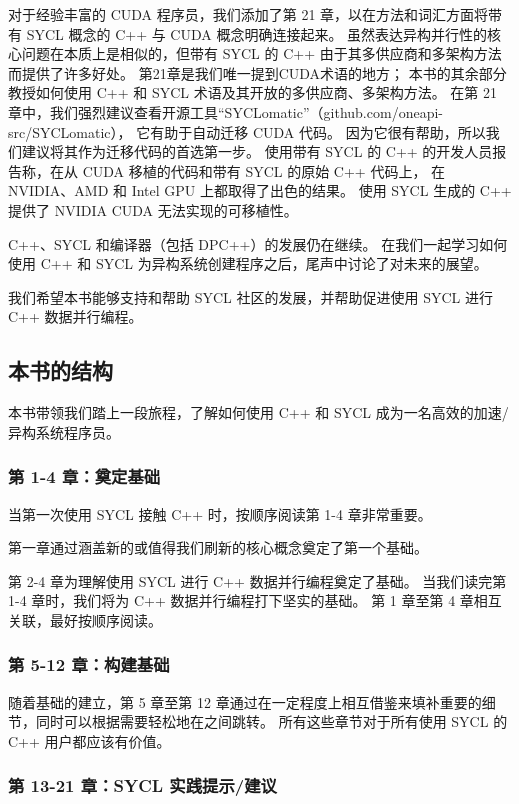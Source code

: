 对于经验丰富的 CUDA 程序员，我们添加了第 21 章，以在方法和词汇方面将带有 SYCL 概念的 C++ 与 CUDA 概念明确连接起来。 
虽然表达异构并行性的核心问题在本质上是相似的，但带有 SYCL 的 C++ 由于其多供应商和多架构方法而提供了许多好处。 
第21章是我们唯一提到CUDA术语的地方； 本书的其余部分教授如何使用 C++ 和 SYCL 术语及其开放的多供应商、多架构方法。 
在第 21 章中，我们强烈建议查看开源工具“SYCLomatic”（github.com/oneapi-src/SYCLomatic），
它有助于自动迁移 CUDA 代码。 因为它很有帮助，所以我们建议将其作为迁移代码的首选第一步。 
使用带有 SYCL 的 C++ 的开发人员报告称，在从 CUDA 移植的代码和带有 SYCL 的原始 C++ 代码上，
在 NVIDIA、AMD 和 Intel GPU 上都取得了出色的结果。 
使用 SYCL 生成的 C++ 提供了 NVIDIA CUDA 无法实现的可移植性。

C++、SYCL 和编译器（包括 DPC++）的发展仍在继续。 
在我们一起学习如何使用 C++ 和 SYCL 为异构系统创建程序之后，尾声中讨论了对未来的展望。

我们希望本书能够支持和帮助 SYCL 社区的发展，并帮助促进使用 SYCL 进行 C++ 数据并行编程。

\subsection{本书的结构}
本书带领我们踏上一段旅程，了解如何使用 C++ 和 SYCL 成为一名高效的加速/异构系统程序员。

\subsubsection{第 1-4 章：奠定基础}
当第一次使用 SYCL 接触 C++ 时，按顺序阅读第 1-4 章非常重要。

第一章通过涵盖新的或值得我们刷新的核心概念奠定了第一个基础。

第 2-4 章为理解使用 SYCL 进行 C++ 数据并行编程奠定了基础。 
当我们读完第 1-4 章时，我们将为 C++ 数据并行编程打下坚实的基础。 第 1 章至第 4 章相互关联，最好按顺序阅读。

\subsubsection{第 5-12 章：构建基础}

随着基础的建立，第 5 章至第 12 章通过在一定程度上相互借鉴来填补重要的细节，同时可以根据需要轻松地在之间跳转。 
所有这些章节对于所有使用 SYCL 的 C++ 用户都应该有价值。

\subsubsection{第 13-21 章：SYCL 实践提示/建议}

